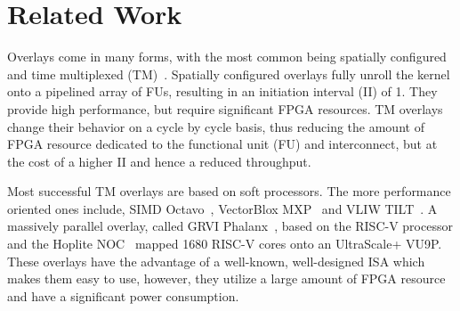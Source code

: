 \section{Related Work}
\label{ch2_related_work}


Overlays come in many forms, with the most common being spatially configured~\cite{jain2016deco, coole2010intermediate} and time multiplexed (TM)~\cite{severance2013embedded, liu2013soft}. 
Spatially configured overlays fully unroll the kernel onto a pipelined array of FUs, resulting in an initiation interval (II) of 1.
They provide high performance, but require significant FPGA resources. 
TM overlays change their behavior on a cycle by cycle basis, thus reducing the amount of FPGA resource dedicated to the functional unit (FU) and interconnect, but at the cost of a higher II and hence a reduced throughput. 

Most successful TM overlays are based on soft processors. 
The more performance oriented ones include, SIMD Octavo~\cite{laforest2017microarchitectural}, VectorBlox MXP~\cite{severance2013embedded} and VLIW TILT~\cite{Ovtcharov2013TILT}. A massively parallel overlay, called GRVI Phalanx~\cite{gray2016grvi}, based on the RISC-V processor and the Hoplite NOC~\cite{kapre2015hoplite} mapped 1680 RISC-V cores onto an UltraScale+ VU9P.
These overlays have the advantage of a well-known, well-designed ISA which makes them easy to use, however, they utilize a large amount of FPGA resource and have a significant power consumption.

